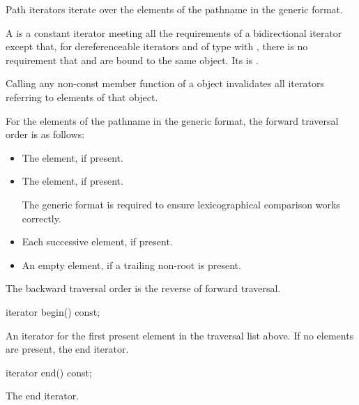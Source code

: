 %
\pnum
Path iterators iterate over the elements of the pathname
in the generic format.

\pnum
A  is a constant iterator meeting all the
requirements of a bidirectional iterator
except that,
for dereferenceable iterators  and 
of type 
with ,
there is no requirement that  and 
are bound to the same object.
Its  is .

\pnum
Calling any non-const member function of a  object
invalidates all iterators referring to elements of that object.

\pnum
For the elements of the pathname in the generic format,
the forward traversal order is as follows:
\begin{itemize}
\item The  element, if present.
\item The  element, if present.
\begin{note}
The generic format is required to ensure lexicographical
comparison works correctly.
\end{note}
\item Each successive  element, if present.
\item An empty element, if a trailing non-root 
is present.
\end{itemize}

\pnum
The backward traversal order is the reverse of forward traversal.

%
\begin{itemdecl}
iterator begin() const;
\end{itemdecl}

\begin{itemdescr}
\pnum
\returns
An iterator for the first present element in the traversal
list above. If no elements are present, the end iterator.
\end{itemdescr}

%
\begin{itemdecl}
iterator end() const;
\end{itemdecl}

\begin{itemdescr}
\pnum
\returns
The end iterator.
\end{itemdescr}

